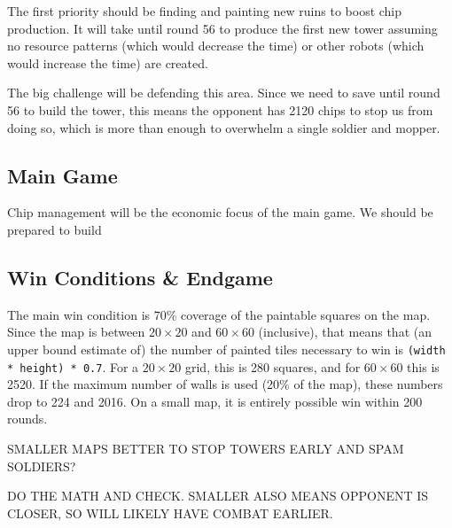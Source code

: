 \documentclass{article}
\begin{document}
  \medskip

  The first priority should be finding and painting new ruins to boost chip production. It will take until round 56 to produce the first new tower assuming no resource patterns (which would decrease the time) or other robots (which would increase the time) are created.

  \medskip

  The big challenge will be defending this area. Since we need to save until round 56 to build the tower, this means the opponent has 2120 chips to stop us from doing so, which is more than enough to overwhelm a single soldier and mopper.

  \subsection*{Main Game}

  Chip management will be the economic focus of the main game. We should be prepared to build 

  \subsection*{Win Conditions \& Endgame}

  The main win condition is 70\% coverage of the paintable squares on the map. Since the map is between $20 \times 20$ and $60 \times 60$ (inclusive), that means that (an upper bound estimate of) the number of painted tiles necessary to win is \verb|(width * height) * 0.7|. For a $20 \times 20$ grid, this is 280 squares, and for $60 \times 60$ this is 2520. If the maximum number of walls is used (20\% of the map), these numbers drop to 224 and 2016. On a small map, it is entirely possible win within 200 rounds.
  \begin{center}
    SMALLER MAPS BETTER TO STOP TOWERS EARLY AND SPAM SOLDIERS?
    
    DO THE MATH AND CHECK. SMALLER ALSO MEANS OPPONENT IS CLOSER, SO WILL LIKELY HAVE COMBAT EARLIER.
  \end{center}
\end{document}
